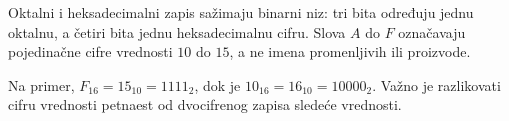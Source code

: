 
Oktalni i heksadecimalni zapis sažimaju binarni niz: tri bita određuju jednu oktalnu, a četiri bita jednu heksadecimalnu cifru. Slova $A$ do $F$ označavaju pojedinačne cifre vrednosti $10$ do $15$, a ne imena promenljivih ili proizvode.

Na primer, $F_{16}=15_{10}=1111_2$, dok je $10_{16}=16_{10}=10000_2$. Važno je razlikovati cifru vrednosti petnaest od dvocifrenog zapisa sledeće vrednosti.
